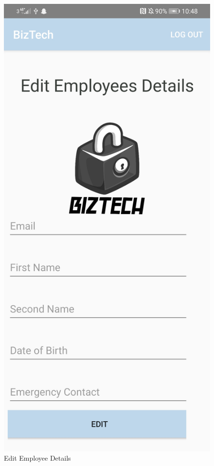 \begin{figure}[!htb]
    \centering
    \includegraphics[scale=0.15]{img/EditEmployeeDetailsPage.jpg}
    \caption{Edit Employee Details}
    \label{fig}
\end{figure}

